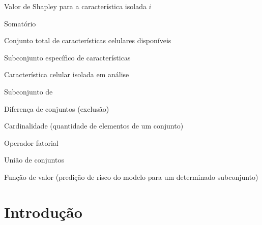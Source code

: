 \documentclass[
    12pt
    ,oneside
    ,a4paper
    ,chapter=TITLE
    ,section=TITLE
    ,sumario=abnt-6027-2012
    ,english,brazil]{abntex2} %
\begin{document}
\begin{simbolos}
  \item[$\phi_i$] Valor de Shapley para a característica isolada $i$
  \item[$\Sigma$] Somatório
  \item[$N$] Conjunto total de características celulares disponíveis
  \item[$S$] Subconjunto específico de características
  \item[$i$] Característica celular isolada em análise
  \item[$\subseteq$] Subconjunto de
  \item[$\setminus$] Diferença de conjuntos (exclusão)
  \item[$|\cdot|$] Cardinalidade (quantidade de elementos de um conjunto)
  \item[$!$] Operador fatorial
  \item[$\cup$] União de conjuntos
  \item[$v(\cdot)$] Função de valor (predição de risco do modelo para um determinado subconjunto)
\end{simbolos}

\listadetabelas










\sumario


\textual

\chapter{Introdução}
\label{cap:introducao}
\end{document}
